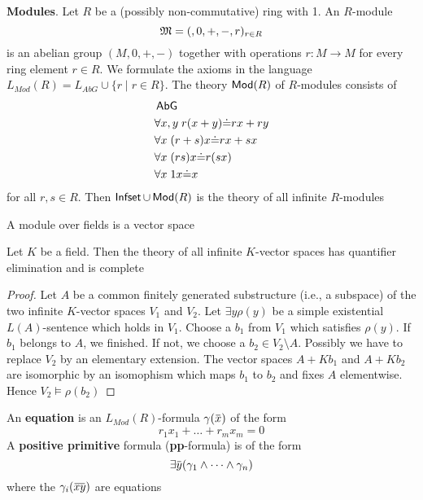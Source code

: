\documentclass[11pt]{article}
\begin{document}
\textbf{Modules}. Let \(R\) be a (possibly non-commutative) ring with 1. An
\(R\)-module
\begin{equation*}
\mathfrak{M}=(,0,+,-,r)_{r\in R}
\end{equation*}
is an abelian group \((M,0,+,-)\) together with operations \(r:M\to M\) for
every ring element \(r\in R\). We formulate the axioms in the language
\(L_{Mod}(R)=L_{AbG}\cup\{r\mid r\in R\}\). The theory \(\operatorname{\textsf{Mod}}(R)\) of
\(R\)-modules consists of
\begin{align*}
&\operatorname{\textsf{AbG}}\\
&\forall x,y\; r(x+y)\dot{=}rx+ry\\
&\forall x\;(r+s)x\dot{=}rx+sx\\
&\forall x\;(rs)x\dot{=}r(sx)\\
&\forall x\;1x\dot{=}x
\end{align*}
for all \(r,s\in R\). Then \(\operatorname{\textsf{Infset}}\cup\operatorname{\textsf{Mod}}(R)\) is the theory of all
infinite \(R\)-modules

A module over fields is a vector space

\begin{theorem}[]
Let \(K\) be a field. Then the theory of all infinite \(K\)-vector spaces has
quantifier elimination and is complete
\end{theorem}

\begin{proof}
Let \(A\) be a common finitely generated substructure (i.e., a subspace) of
the two infinite \(K\)-vector spaces \(V_1\) and \(V_2\). Let \(\exists y\rho(y)\) be a simple
existential \(L(A)\)-sentence which holds in \(V_1\).
Choose a \(b_1\) from \(V_1\) which satisfies \(\rho(y)\). If \(b_1\) belongs to
\(A\), we finished. If not, we choose a \(b_2\in V_2\setminus A\). Possibly
we have to replace \(V_2\) by an elementary extension. The vector spaces
\(A+Kb_1\) and \(A+Kb_2\) are isomorphic by an isomophism which maps \(b_1\)
to \(b_2\) and fixes \(A\) elementwise. Hence \(V_2\vDash\rho(b_2)\)
\end{proof}

\begin{definition}[]
An \textbf{equation} is an \(L_{Mod}(R)\)-formula \(\gamma(\bbar{x})\) of the form
\begin{equation*}
r_1x_1+\dots+r_mx_m=0
\end{equation*}
A \textbf{positive primitive} formula (\textbf{pp}-formula) is of the form
\begin{equation*}
\exists\bbar{y}(\gamma_1\wedge\dots\wedge\gamma_n)
\end{equation*}
where the \(\gamma_i(\bbar{xy})\) are equations
\end{definition}
\end{document}
